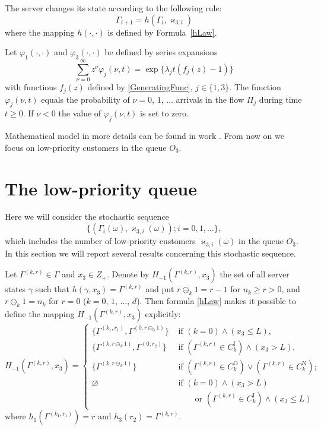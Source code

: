\documentclass[60x84/16,10pt]{dccn}
\begin{document}
{The server changes its state according to the following rule:
\begin{equation}
\Gamma_{i+1}=h(\Gamma_i,\varkappa_{3,i})
\label{gammaFunc}
\end{equation}
where the mapping $h(\cdot,\cdot)$ is defined by Formula~\eqref{hLaw}.

Let $\varphi_1(\cdot,\cdot)$ and $\varphi_3(\cdot,\cdot)$ be defined by series expansions
\begin{equation*}
\sum_{\nu=0}^{\infty} z^\nu\varphi_j(\nu,t) = \exp\{\lambda_j t (f_j(z)-1)\}
\end{equation*}
with functions $f_j(z)$ defined by \eqref{GeneratingFunc}, $j \in \{1,3\}$. The function
$\varphi_j(\nu,t)$ equals the probability of  $\nu=0$, $1$, $\ldots${} arrivals in the flow
$\Pi_j$ during time $t \geqslant 0$. If $\nu < 0$ the value of $\varphi_j(\nu,t)$ is set to
zero.

Mathematical model in more details can be found in work \cite{k:z:2016}. From now on we focus on low-priority customers in the queue $O_3$. 

\section{The low-priority queue}

Here we will consider the stochastic sequence
\begin{equation}
\label{eq:theMC}
\{(\Gamma_i(\omega), \varkappa_{3, i}(\omega)); i =0, 1, \ldots\},
\end{equation}
which includes the number of low-priority customers $\varkappa_{3, i}(\omega)$ in the queue $O_3$.  In this
section we will report several results concerning this stochastic sequence.

Let $\Gamma^{(k,r)}\in \Gamma$ and $x_3 \in Z_+$. Denote by 
$H_{-1}(\Gamma^{(k,r)}, x_3)$ the set of all server states $\gamma$ such that $h(\gamma, x_3) =
\Gamma^{(k,r)}$ and put $r \ominus_k 1
= r-1$ for $n_k \geqslant r>0$, and $r \ominus_k 1 = n_k$ for $r=0$ ($k = 0$, $1$, $\ldots$, $d$).
Then formula \eqref{hLaw} makes it possible to define  the mapping $H_{-1}(\Gamma^{(k,r)}, x_3)$ explicitly:
\begin{equation}
H_{-1}(\Gamma^{(k,r)}, x_3) = 
\begin{cases}
\bigl\{\Gamma^{(k_1,r_1)}, \Gamma^{(0,r\ominus_0 1)}\bigr\}&  \text{ if  $(k=0) \wedge (x_3 \leqslant L)$,}\\
\bigl\{\Gamma^{(k,r\ominus_k 1)}, \Gamma^{(0,r_2)}\bigr\}&  \text{ if  $(\Gamma^{(k,r)}\in C_k^{\mathrm{I}})
  \wedge (x_3>L)$,}\\ 
\bigl\{\Gamma^{(k,r\ominus_k 1)}\bigr\}&  \text{ if  $(\Gamma^{(k,r)}\in C_k^{\mathrm{O}}) \vee (\Gamma^{(k,r)}\in C_k^{\mathrm{N}})$;}\\
\varnothing&  \text{ if  $(k = 0)\wedge  (x_3>L)$}\\
 & \qquad \text{ or $(\Gamma^{(k,r)}\in C_k^{\mathrm{I}}) \wedge (x_3\leqslant L)$}
\end{cases}
\end{equation}
where $h_1(\Gamma^{(k_1,r_1)})=r$ and $h_3(r_2)=\Gamma^{(k,r)}$.

}
\end{document}
